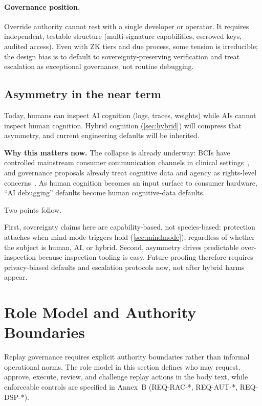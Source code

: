 \documentclass[11pt]{article}
\theoremstyle{definition}
\theoremstyle{plain}
\theoremstyle{remark}
\begin{document}
\paragraph{Governance position.}
Override authority cannot rest with a single developer or operator.
It requires independent, testable structure (multi-signature capabilities, escrowed keys, audited access).
Even with ZK tiers and due process, some tension is irreducible; the design bias is to default to sovereignty-preserving verification and treat escalation as exceptional governance, not routine debugging.

\subsection{Asymmetry in the near term}
\label{sec:asymmetry}

Today, humans can inspect AI cognition (logs, traces, weights) while AIs cannot inspect human cognition.
Hybrid cognition (\cref{sec:hybrid}) will compress that asymmetry, and current engineering defaults will be inherited.

\noindent\textbf{Why this matters now.}
The collapse is already underway: BCIs have controlled mainstream consumer communication channels in clinical settings~\cite{wolpaw2002,moses2021}, and governance proposals already treat cognitive data and agency as rights-level concerns~\cite{yuste2017,iencaandorno2017}.
As human cognition becomes an input surface to consumer hardware, ``AI debugging'' defaults become human cognitive-data defaults.


Two points follow.

First, sovereignty claims here are capability-based, not species-based:
protection attaches when mind-mode triggers hold (\cref{sec:mindmode}), regardless of whether the subject is human, AI, or hybrid.
Second, asymmetry drives predictable over-inspection because inspection tooling is easy.
Future-proofing therefore requires privacy-biased defaults and escalation protocols now, not after hybrid harms appear.

\section{Role Model and Authority Boundaries}
\label{sec:roles}

Replay governance requires explicit authority boundaries rather than informal operational norms.
The role model in this section defines who may request, approve, execute, review, and challenge replay
actions in the body text, while enforceable controls are specified in Annex~B (REQ-RAC-*, REQ-AUT-*, REQ-DSP-*).
\end{document}
